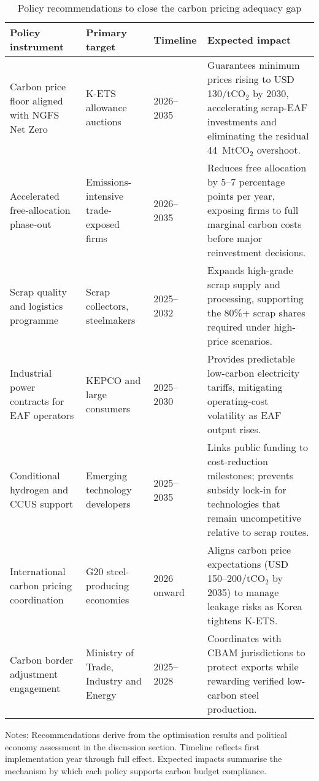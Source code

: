 \begin{table}[ht]
  \centering
  \caption{Policy recommendations to close the carbon pricing adequacy gap}
  \label{tab:policy-matrix}
  \begin{threeparttable}
  \begin{tabular}{@{}p{3.2cm}p{3.2cm}p{2.2cm}p{5.2cm}@{}}
    \toprule
    Policy instrument & Primary target & Timeline & Expected impact \\
    \midrule
    Carbon price floor aligned with NGFS Net Zero & K-ETS allowance auctions & 2026--2035 & Guarantees minimum prices rising to USD\,130/tCO$_2$ by 2030, accelerating scrap-EAF investments and eliminating the residual 44~MtCO$_2$ overshoot. \\
    Accelerated free-allocation phase-out & Emissions-intensive trade-exposed firms & 2026--2035 & Reduces free allocation by 5--7 percentage points per year, exposing firms to full marginal carbon costs before major reinvestment decisions. \\
    Scrap quality and logistics programme & Scrap collectors, steelmakers & 2025--2032 & Expands high-grade scrap supply and processing, supporting the 80\%+ scrap shares required under high-price scenarios. \\
    Industrial power contracts for EAF operators & KEPCO and large consumers & 2025--2030 & Provides predictable low-carbon electricity tariffs, mitigating operating-cost volatility as EAF output rises. \\
    Conditional hydrogen and CCUS support & Emerging technology developers & 2025--2035 & Links public funding to cost-reduction milestones; prevents subsidy lock-in for technologies that remain uncompetitive relative to scrap routes. \\
    International carbon pricing coordination & G20 steel-producing economies & 2026 onward & Aligns carbon price expectations (USD\,150--200/tCO$_2$ by 2035) to manage leakage risks as Korea tightens K-ETS. \\
    Carbon border adjustment engagement & Ministry of Trade, Industry and Energy & 2025--2028 & Coordinates with CBAM jurisdictions to protect exports while rewarding verified low-carbon steel production. \\
    \bottomrule
  \end{tabular}
  \begin{tablenotes}
    \footnotesize
    \item Notes: Recommendations derive from the optimisation results and political economy assessment in the discussion section. Timeline reflects first implementation year through full effect. Expected impacts summarise the mechanism by which each policy supports carbon budget compliance.
  \end{tablenotes}
  \end{threeparttable}
\end{table}

